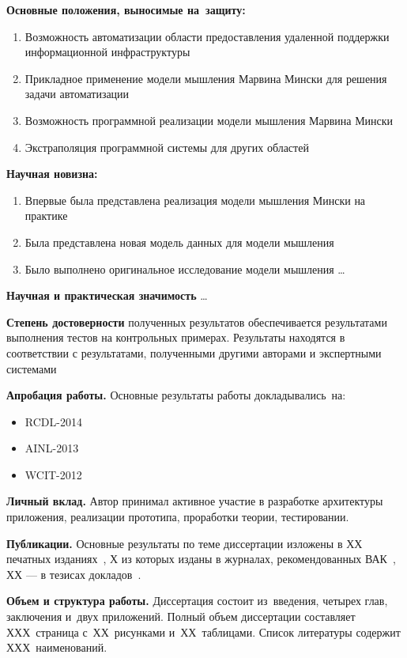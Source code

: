 \textbf{Основные положения, выносимые на~защиту:}
\begin{enumerate}
  \item Возможность автоматизации области предоставления удаленной поддержки информационной инфраструктуры 
  \item Прикладное применение модели мышления Марвина Мински для решения задачи автоматизации
  \item Возможность программной реализации модели мышления Марвина Мински
  \item Экстраполяция программной системы для других областей
\end{enumerate}

\textbf{Научная новизна:}
\begin{enumerate}
  \item Впервые была представлена реализация модели мышления Мински на практике
  \item Была представлена новая модель данных для модели мышления 
  \item Было выполнено оригинальное исследование модели мышления \ldots
\end{enumerate}

\textbf{Научная и практическая значимость} \ldots

\textbf{Степень достоверности} полученных результатов обеспечивается результатами выполнения тестов на контрольных примерах. Результаты находятся в соответствии с результатами, полученными другими авторами и экспертными системами

\textbf{Апробация работы.}
Основные результаты работы докладывались~на:
\begin{itemize}
	\item RCDL-2014
	\item AINL-2013
	\item WCIT-2012
\end{itemize}




\textbf{Личный вклад.} Автор принимал активное участие в разработке архитектуры приложения, реализации прототипа, проработки теории, тестировании.

\textbf{Публикации.} Основные результаты по теме диссертации изложены в ХХ печатных изданиях~\cite{Sychev,Sokolov,Gaidaenko,Lermontov,Management},
Х из которых изданы в журналах, рекомендованных ВАК~\cite{Sychev,Sokolov,Gaidaenko}, 
ХХ --- в тезисах докладов~\cite{Lermontov,Management}.

\textbf{Объем и структура работы.} Диссертация состоит из~введения, четырех глав, заключения и~двух приложений. Полный объем диссертации составляет ХХХ~страница с~ХХ~рисунками и~ХХ~таблицами. Список литературы содержит ХХХ~наименований.

\clearpage